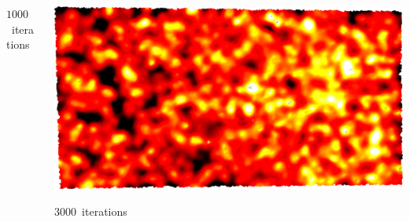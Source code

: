 \documentclass[aspectratio=169,t]{beamer}
\begin{document}
{\begin{columns}
\begin{column}{0.5\textwidth}
			{\footnotesize
				\par \vspace{-1mm} $1000$~iterations
			}
		\end{column}
		\begin{column}{0.5\textwidth}
			\centering
			\includegraphics[width=.75\textwidth]{data/acquired_meshes/ILATO_1A_SM2066-HE5-60_070214_merged_GMO_r1_n4_v256_funcvals_3000iter.png}
			{\footnotesize
				\par \vspace{-1mm} $3000$~iterations
			}
		\end{column}
	\end{columns}
}
\end{document}
